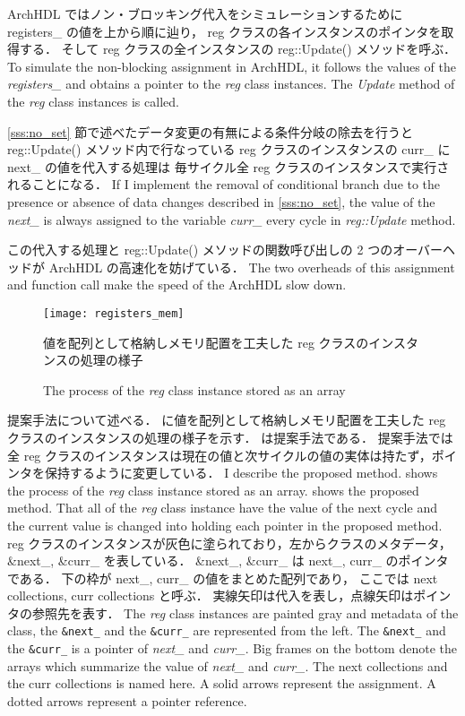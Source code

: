 ArchHDL ではノン・ブロッキング代入をシミュレーションするために registers\_ の値を上から順に辿り，
reg クラスの各インスタンスのポインタを取得する．
そして reg クラスの全インスタンスの reg::Update() メソッドを呼ぶ．
\fi
To simulate the non-blocking assignment in ArchHDL,
it follows the values of the \textit{registers\_}
and obtains a pointer to the \textit{reg} class instances.
The \textit{Update} method of the \textit{reg} class instances is called.

\ref{sss:no_set} 節で述べたデータ変更の有無による条件分岐の除去を行うと reg::Update() メソッド内で行なっている
reg クラスのインスタンスの curr\_ に next\_ の値を代入する処理は
毎サイクル全 reg クラスのインスタンスで実行されることになる．
\fi
If I implement the removal of conditional branch due to the presence or absence of data changes described in \ref{sss:no_set},
the value of the \textit{next\_} is always assigned to the variable \textit{curr\_} every cycle in \textit{reg::Update} method.

この代入する処理と reg::Update() メソッドの関数呼び出しの 2 つのオーバーヘッドが ArchHDL の高速化を妨げている．
\fi
The two overheads of this assignment and function call make the speed of the ArchHDL slow down.

\begin{figure}[t]
 \centering
 \texttt{[image: registers\_mem]}
 \caption{値を配列として格納しメモリ配置を工夫した reg クラスのインスタンスの処理の様子}
\fi
 \caption{The process of the \textit{reg} class instance stored as an array}
 \label{fig:mem_copy}
\end{figure}

提案手法について述べる．
 に値を配列として格納しメモリ配置を工夫した reg クラスのインスタンスの処理の様子を示す．
 は提案手法である．
提案手法では全 reg クラスのインスタンスは現在の値と次サイクルの値の実体は持たず，ポインタを保持するように変更している．
\fi
I describe the proposed method.
 shows the process of the \textit{reg} class instance stored as an array.
 shows the proposed method.
That all of the \textit{reg} class instance have the value of the next cycle and the current value is changed into holding each pointer in the proposed method.
reg クラスのインスタンスが灰色に塗られており，左からクラスのメタデータ，\&next\_, \&curr\_ を表している．
\&next\_, \&curr\_ は next\_, curr\_ のポインタである．
下の枠が next\_, curr\_ の値をまとめた配列であり，
ここでは next collections, curr collections と呼ぶ．
実線矢印は代入を表し，点線矢印はポインタの参照先を表す．
\fi
The \textit{reg} class instances are painted gray
and metadata of the class, the \texttt{\&next\_} and the \texttt{\&curr\_} are represented from the left.
The \texttt{\&next\_} and the \texttt{\&curr\_} is a pointer of \textit{next\_} and \textit{curr\_}.
Big frames on the bottom denote the arrays which summarize the value of \textit{next\_} and \textit{curr\_}.
The next collections and the curr collections is named here.
A solid arrows represent the assignment.
A dotted arrows represent a pointer reference.

